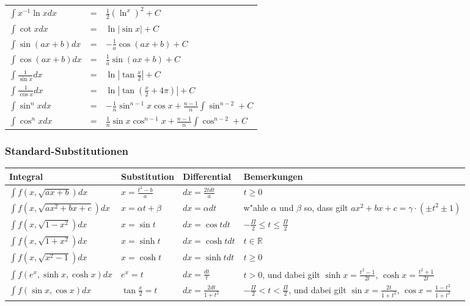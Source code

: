 \documentclass[10pt, a4paper, twocolumn]{scrartcl}
\begin{document}
\begin{tabular}{lcl}
 $\int x^{-1}\ln x dx$ & = &			$\frac{1}{2}(\ln^x)^2 +C$\\
 $\int \cot x dx$ & = &				$\ln|\sin x| +C$\\
 $\int \sin (ax +b) dx$ & = &			$-\frac{1}{a}\cos(ax+b) +C$\\
 $\int \cos (ax +b) dx$ & = &			$\frac{1}{a}\sin(ax+b) +C$\\
 $\int \frac{1}{\sin x}dx$ & = &		$\ln|\tan\frac{x}{2}| +C$\\
 $\int \frac{1}{\cos x}dx$ & = &		$\ln|\tan(\frac{x}{2}+4\pi)| +C$\\
 $\int \sin^nxdx$ & = &				$-\frac{1}{n}\sin^{n-1}x\cos x+\frac{n-1}{n}\int\sin^{n-2} +C$\\
 $\int \cos^nxdx$ & = &				$\frac{1}{n}\sin x\cos^{n-1} x+\frac{n-1}{n}\int\cos^{n-2} +C$\\
\end{tabular}
\normalsize

\subsubsection{Standard-Substitutionen}

\tiny
\begin{tabular}{|l|l|p{1.2cm}|p{1.3cm}|}
 \hline
 Integral & Substitution &  Differential  & Bemerkungen \\ \hline \hline

 $\int f(x,\sqrt{ax+b})dx$ & 		$x=\frac{t^2-b}{a}$ & 		$dx=\frac{2tdt}{a}$ &	$t\geq 0$\\ \hline
 $\int f(x,\sqrt{ax^2+bx+c})dx$ & 	$x=\alpha t+\beta$ & 		$dx=\alpha dt$ &	w"ahle $\alpha$ und $\beta$ so, dass gilt $ax^2+bx+c=\gamma\cdotp(\pm t^2\pm 1)$ \\ \hline
 $\int f(x,\sqrt{1-x^2})dx$ & 		$x=\sin t$ & 			$dx=\cos t dt$ &	$-\frac{\Pi}{2}\leq t \leq \frac{\Pi}{2}$\\ \hline
 $\int f(x,\sqrt{1+x^2})dx$ &		$x=\sinh t$ & 			$dx=\cosh t dt$ &	$t\in\mathbb{R}$\\ \hline
 $\int f(x,\sqrt{x^2-1})dx$ &		$x=\cosh t$ & 			$dx=\sinh t dt$ &	$t \geq 0$\\ \hline
 $\int f(e^x, \sinh x, \cosh x)dx$ & 	$e^x=t$ & 			$dx=\frac{dt}{t}$ &	$t>0$, und dabei gilt $\sinh x =\frac{t^2-1}{2t}$, $\cosh x= \frac{t^2+1}{2t}$ \\ \hline
 $\int f(\sin x, \cos x)dx$ & 		$\tan \frac{x}{2} = t$ & 	$dx=\frac{2dt}{1+t^2}$ &$-\frac{\Pi}{2}<t<\frac{\Pi}{2}$, und dabei gilt $\sin x =\frac{2t}{1+t^2}$, $\cos x = \frac{1-t^2}{1+t^2}$ \\ \hline
\end{tabular}
\normalsize
\end{document}
